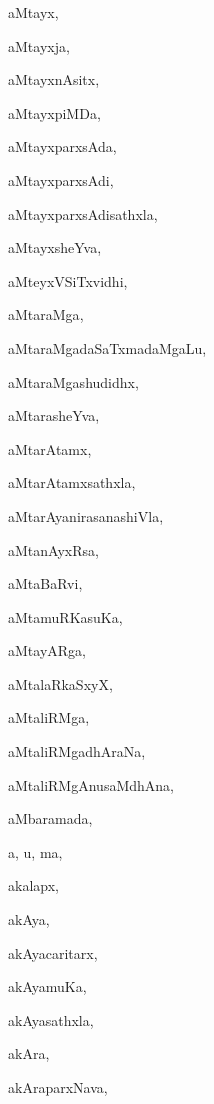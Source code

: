 \begin{multicols}{2}
{aMtayx}, \pageref{aMtayx}

{aMtayxja}, \pageref{aMtayxja}

{aMtayxnAsitx}, \pageref{aMtayxnAsitx}

{aMtayxpiMDa}, \pageref{aMtayxpiMDa}

{aMtayxparxsAda}, \pageref{aMtayxparxsAda}

{aMtayxparxsAdi}, \pageref{aMtayxparxsAdi}

{aMtayxparxsAdisathxla}, \pageref{aMtayxparxsAdisathxla}

{aMtayxsheYva}, \pageref{aMtayxsheYva}

{aMteyxVSiTxvidhi}, \pageref{aMteyxVSiTxvidhi}

{aMtaraMga}, \pageref{aMtaraMga}

{aMtaraMgadaSaTxmadaMgaLu}, \pageref{aMtaraMgadaSaTxmadaMgaLu}

{aMtaraMgashudidhx}, \pageref{aMtaraMgashudidhx}

{aMtarasheYva}, \pageref{aMtarasheYva}

{aMtarAtamx}, \pageref{aMtarAtamx}

{aMtarAtamxsathxla}, \pageref{aMtarAtamxsathxla}

{aMtarAyanirasanashiVla}, \pageref{aMtarAyanirasanashiVla}

{aMtanAyxRsa}, \pageref{aMtanAyxRsa}

{aMtaBaRvi}, \pageref{aMtaBaRvi}

{aMtamuRKasuKa}, \pageref{aMtamuRKasuKa}

{aMtayARga}, \pageref{aMtayARga}

{aMtalaRkaSxyX}, \pageref{aMtalaRkaSxyX}

{aMtaliRMga}, \pageref{aMtaliRMga}

{aMtaliRMgadhAraNa}, \pageref{aMtaliRMgadhAraNa}

{aMtaliRMgAnusaMdhAna}, \pageref{aMtaliRMgAnusaMdhAna}

{aMbaramada}, \pageref{aMbaramada}

{a, u, ma}, \pageref{a, u, ma}

{akalapx}, \pageref{akalapx}

{akAya}, \pageref{akAya}

{akAyacaritarx}, \pageref{akAyacaritarx}

{akAyamuKa}, \pageref{akAyamuKa}

{akAyasathxla}, \pageref{akAyasathxla}

{akAra}, \pageref{akAra}

{akAraparxNava}, \pageref{akAraparxNava}


\end{multicols}
